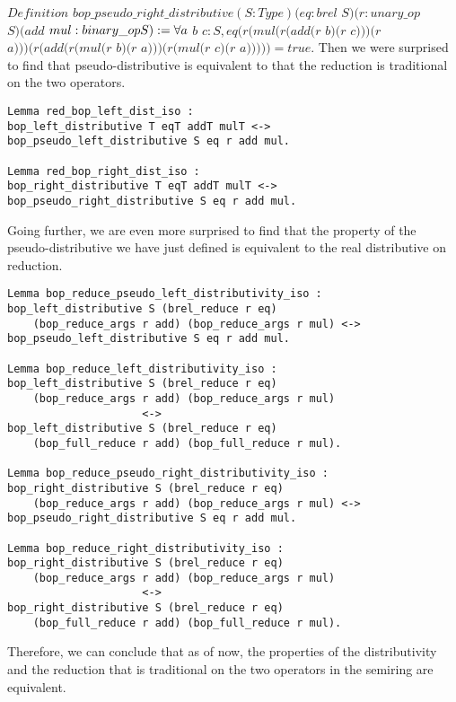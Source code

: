 \documentclass[a4paper,12pt,twoside,openright]{report}
\begin{document}
$Definition$ $bop\_pseudo\_right\_distributive (S : Type) (eq : brel$ $S) (r : unary\_op$ $S) (add$ $mul : binary\_op S) \\
  := \forall a$ $b$ $c : S, 
  eq (r (mul (r (add (r$ $b) (r$ $c))) (r$ $a))) (r (add (r (mul (r$ $b) (r$ $a))) (r (mul (r$ $c) (r$ $a))))) = true.$
Then we were surprised to find that pseudo-distributive is equivalent to that the reduction is traditional on the two operators.
\begin{lstlisting}
Lemma red_bop_left_dist_iso : 
bop_left_distributive T eqT addT mulT <-> 
bop_pseudo_left_distributive S eq r add mul. 

Lemma red_bop_right_dist_iso : 
bop_right_distributive T eqT addT mulT <-> 
bop_pseudo_right_distributive S eq r add mul.
\end{lstlisting}
Going further, we are even more surprised to find that the property of the pseudo-distributive we have just defined is equivalent to the real distributive on reduction.
\begin{lstlisting}
Lemma bop_reduce_pseudo_left_distributivity_iso :
bop_left_distributive S (brel_reduce r eq) 
	(bop_reduce_args r add) (bop_reduce_args r mul) <->
bop_pseudo_left_distributive S eq r add mul.

Lemma bop_reduce_left_distributivity_iso :
bop_left_distributive S (brel_reduce r eq) 
	(bop_reduce_args r add) (bop_reduce_args r mul)
                     <->
bop_left_distributive S (brel_reduce r eq) 
	(bop_full_reduce r add) (bop_full_reduce r mul).

Lemma bop_reduce_pseudo_right_distributivity_iso :
bop_right_distributive S (brel_reduce r eq) 
	(bop_reduce_args r add) (bop_reduce_args r mul) <->
bop_pseudo_right_distributive S eq r add mul.

Lemma bop_reduce_right_distributivity_iso :
bop_right_distributive S (brel_reduce r eq) 
	(bop_reduce_args r add) (bop_reduce_args r mul)
                     <->
bop_right_distributive S (brel_reduce r eq) 
	(bop_full_reduce r add) (bop_full_reduce r mul).
\end{lstlisting}

Therefore, we can conclude that as of now, the properties of the distributivity and the reduction that is traditional on the two operators in the semiring are equivalent.
\end{document}
